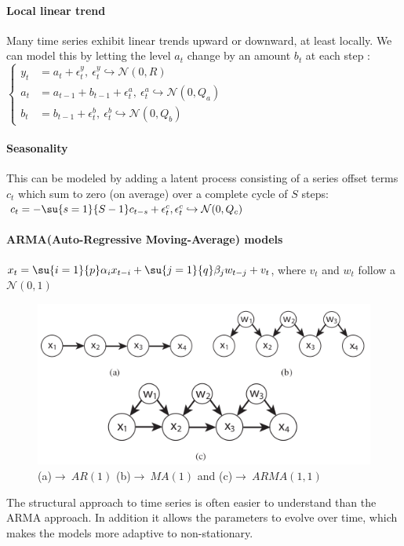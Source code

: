\paragraph{Local linear trend}
Many time series exhibit linear trends upward or downward, at least locally. We can model this by
letting the level $a_{t}$ change by an amount $b_{t}$ at each step :
$\begin{cases}
    y_{t} &= a_{t} + \epsilon^{y}_{t},~\epsilon^{y}_{t}\hookrightarrow \mathcal{N}(0, R)\\
    a_{t} &= a_{t-1} + b_{t-1} + \epsilon^{a}_{t},~\epsilon^{a}_{t}\hookrightarrow \mathcal{N}(0, 
    Q_{a})\\
    b_{t} &= b_{t-1} + \epsilon^{b}_{t},~\epsilon^{b}_{t}\hookrightarrow \mathcal{N}(0, Q_{b})
\end{cases}$
\paragraph{Seasonality}
This can be modeled by adding a latent process consisting of a series offset terms $c_{t}$ which
sum to zero (on average) over a complete cycle of $S$ steps:
$c_{t} = -\su{s=1}{S-1}c_{t-s}+\epsilon^{c}_{t}, \epsilon^{c}_{t}\hookrightarrow\mathcal{N}(0, 
Q_{c})$

\paragraph{ARMA(Auto-Regressive Moving-Average) models}
$x_{t} = \su{i=1}{p}\alpha_{i}x_{t-i} + \su{j=1}{q}\beta_{j}w_{t-j}+v_{t}$, where $v_{t}$ and $w_{t}$
follow a $\mathcal{N}(0, 1)$
\begin{figure}[H]
    \begin{center}
        \includegraphics[width=.5\textwidth]{./chapters/2_statistics/07_hidden_markov_models/2_images/1_arma_graph.png}
    \end{center}
    \caption{(a)$\rightarrow~AR(1)$ (b)$\rightarrow~MA(1)$ and (c)$\rightarrow~ARMA(1,1)$}
    \label{fig:1_arma_graph}
\end{figure}
The structural approach to time series is often easier to understand than the ARMA approach.
In addition it allows the parameters to evolve over time, which makes the models more adaptive to 
non-stationary.


